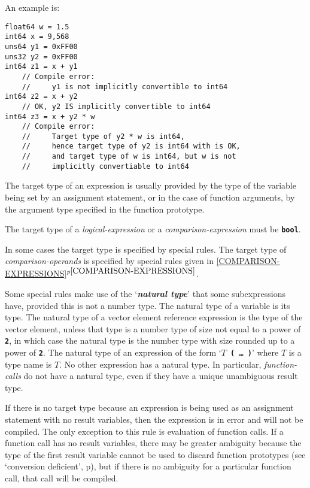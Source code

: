 \documentclass[12pt]{article}
\newcommand{\TT}[1]{{\tt \bfseries #1}}
\newcommand{\key}[1]{{\bf \em #1}\index{#1}}
\newcommand{\itemref}[1]{\ref{#1}$^{p\pageref{#1}}$}
\newcommand{\pagref}[1]{p\pageref{#1}}
\newenvironment{indpar}[1][0.3in]%
	{\begin{list}{}%
		     {\setlength{\itemsep}{0in}%
		      \setlength{\topsep}{0in}%
		      \setlength{\parsep}{1ex}%
		      \setlength{\labelwidth}{#1}%
		      \setlength{\leftmargin}{#1}%
		      \addtolength{\leftmargin}{\labelsep}}%
	 \item}%
	{\end{list}}
\begin{document}
An example is:

\begin{indpar}\begin{verbatim}
float64 w = 1.5
int64 x = 9,568
uns64 y1 = 0xFF00
uns32 y2 = 0xFF00
int64 z1 = x + y1
    // Compile error:
    //     y1 is not implicitly convertible to int64
int64 z2 = x + y2
    // OK, y2 IS implicitly convertible to int64
int64 z3 = x + y2 * w
    // Compile error:
    //     Target type of y2 * w is int64,
    //     hence target type of y2 is int64 with is OK,
    //     and target type of w is int64, but w is not
    //     implicitly convertiable to int64
\end{verbatim}\end{indpar}

The target type of an expression is usually provided by the
type of the variable being set by an assignment statement, or in the
case of function arguments, by the argument type specified in the
function prototype.

The target type of a {\em logical-expression} or a {\em comparison-expression}
must be \TT{bool}.

In some cases the target type is specified by special rules.  The
target type of {\em comparison-operands} is specified by special
rules given in \itemref{COMPARISON-EXPRESSIONS}.

Some special rules
make use of the `\key{natural type}'\label{NATURAL-TYPE}
that some subexpressions have, provided this is not a number type.
The natural type of a variable is its type.  The natural
type of a vector element reference expression is the type of the
vector element, unless that type is a number type of size not
equal to a power of \TT{2}, in which case the natural type is
the number type with size rounded up to a power of \TT{2}.
The natural type of an expression of the
form `\TT{$T$ ( \ldots{} )}' where $T$ is a type name is $T$.
No other expression has a natural type.  In particular,
{\em function-calls} do not have a natural type, even if
they have a unique unambiguous result type.

If there is no target type because an expression is being used
as an assignment statement with no result variables, then
the expression is in error and will not be compiled.
The only exception to this rule
is evaluation of function calls.  If a function call has no
result variables, there may be greater ambiguity because the
type of the first result variable cannot be used to discard function
prototypes (see `conversion deficient', \pagref{CONVERSION-DEFICIENT}),
but if there is no ambiguity for a particular
function call, that call will be compiled.
\end{document}
